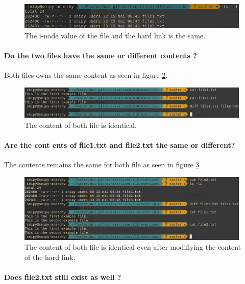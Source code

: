 \documentclass[a4paper,11pt]{report}
\begin{document}
\begin{figure}[h]
  \centering
  \includegraphics[width=0.99\textwidth]{figures/ex5-a}
  \caption{\label{fig:ex5-a} The i-node value of the file and the hard link is the same.}
\end{figure}

\paragraph{Do the two files have the same or different contents ?}

Both files owns the same content as seen in figure \ref{fig:ex5-b}.

\begin{figure}[h]
  \centering
  \includegraphics[width=0.99\textwidth]{figures/ex5-b}
  \caption{\label{fig:ex5-b} The content of both file is identical.}
\end{figure}

\paragraph{Are the cont ents of file1.txt and file2.txt the same or different?}

The contents remains the same for both file as seen in figure \ref{fig:ex5-c}

\begin{figure}[h]
  \centering
  \includegraphics[width=0.99\textwidth]{figures/ex5-c}
  \caption{\label{fig:ex5-c} The content of both file is identical even after
    modifiying the content of the hard link.}
\end{figure}

\paragraph{Does file2.txt still exist as well ?}
\end{document}
